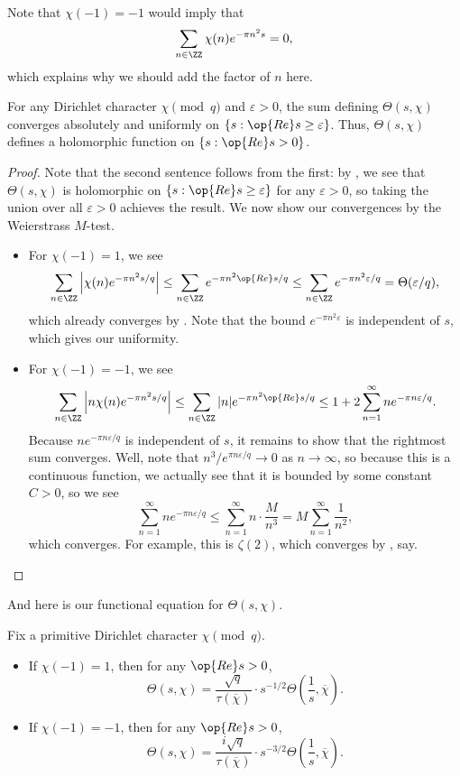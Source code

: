 \documentclass[../notes.tex]{subfiles}
\begin{document}
Note that $\chi(-1)=-1$ would imply that
\[\sum_{n\in\ZZ}\chi(n)e^{-\pi n^2s}=0,\]
which explains why we should add the factor of $n$ here.
\begin{lemma}
	For any Dirichlet character $\chi\pmod q$ and $\varepsilon>0$, the sum defining $\Theta(s,\chi)$ converges absolutely and uniformly on $\{s:\op{Re}s\ge\varepsilon\}$. Thus, $\Theta(s,\chi)$ defines a holomorphic function on $\{s:\op{Re}s>0\}$.
\end{lemma}
\begin{proof}
	Note that the second sentence follows from the first: by , we see that $\Theta(s,\chi)$ is holomorphic on $\{s:\op{Re}s\ge\varepsilon\}$ for any $\varepsilon>0$, so taking the union over all $\varepsilon>0$ achieves the result. We now show our convergences by the Weierstrass $M$-test.
	\begin{itemize}
		\item For $\chi(-1)=1$, we see
		\[\sum_{n\in\ZZ}\left|\chi(n)e^{-\pi n^2s/q}\right|\le\sum_{n\in\ZZ}e^{-\pi n^2\op{Re}s/q}\le\sum_{n\in\ZZ}e^{-\pi n^2\varepsilon/q}=\Theta(\varepsilon/q),\]
		which already converges by . Note that the bound $e^{-\pi n^2\varepsilon}$ is independent of $s$, which gives our uniformity.
		\item For $\chi(-1)=-1$, we see
		\[\sum_{n\in\ZZ}\left|n\chi(n)e^{-\pi n^2s/q}\right|\le\sum_{n\in\ZZ}|n|e^{-\pi n^2\op{Re}s/q}\le1+2\sum_{n=1}^\infty ne^{-\pi n\varepsilon/q}.\]
		Because $ne^{-\pi n\varepsilon/q}$ is independent of $s$, it remains to show that the rightmost sum converges. Well, note that $n^3/e^{\pi n\varepsilon/q}\to0$ as $n\to\infty$, so because this is a continuous function, we actually see that it is bounded by some constant $C>0$, so we see
		\[\sum_{n=1}^\infty ne^{-\pi n\varepsilon/q}\le\sum_{n=1}^\infty n\cdot\frac M{n^3}=M\sum_{n=1}^\infty\frac1{n^2},\]
		which converges. For example, this is $\zeta(2)$, which converges by , say.
		\qedhere
	\end{itemize}
\end{proof}
And here is our functional equation for $\Theta(s,\chi)$.
\begin{proposition}
	Fix a primitive Dirichlet character $\chi\pmod q$.
	\begin{itemize}
		\item If $\chi(-1)=1$, then for any $\op{Re}s>0$,
		\[\Theta(s,\chi)=\frac{\sqrt{q}}{\tau(\overline\chi)}\cdot s^{-1/2}\Theta\left(\frac1s,\overline\chi\right).\]
		\item If $\chi(-1)=-1$, then for any $\op{Re}s>0$,
		\[\Theta(s,\chi)=\frac{i\sqrt{q}}{\tau(\overline\chi)}\cdot s^{-3/2}\Theta\left(\frac1s,\overline\chi\right).\]
	\end{itemize}
\end{proposition}
\end{document}
